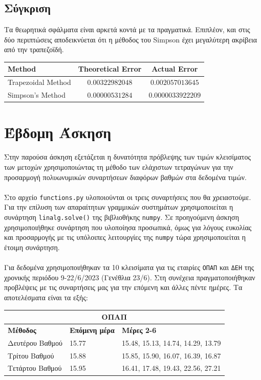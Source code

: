 \documentclass{article}
\begin{document}
\subsection{Σύγκριση}
Τα θεωρητικά σφάλματα είναι αρκετά κοντά με τα πραγματικά. Επιπλέον, και στις δύο περιπτώσεις αποδεικνύεται ότι η μέθοδος του Simpson έχει μεγαλύτερη ακρίβεια από την τραπεζοϊδή.
\begin{table}[h!]
\centering
\begin{tabular}{|l|c|c|}
\hline
\textbf{Method} & \textbf{Theoretical Error} & \textbf{Actual Error} \\
\hline
Trapezoidal Method & \( 0.00322982048 \) & \( 0.002057013645 \) \\
\hline
Simpson's Method & \( 0.00000531284 \) & \( 0.0000033922209 \) \\
\hline
\end{tabular}
\end{table}

\section{Έβδομη Άσκηση}
Στην παρούσα άσκηση εξετάζεται η δυνατότητα πρόβλεψης των τιμών κλεισίματος των μετοχών χρησιμοποιώντας τη μέθοδο των ελάχιστων τετραγώνων για την προσαρμογή πολυωνυμικών συναρτήσεων διαφόρων βαθμών στα δεδομένα τιμών.\\\\
Στο αρχείο \texttt{functions.py} υλοποιούνται οι τρεις συναρτήσεις που θα χρειαστούμε. Για την επίλυση των απαραίτητων γραμμικών συστημάτων χρησιμοποιείται η συνάρτηση \texttt{linalg.solve()} της βιβλιοθήκης \texttt{numpy}. Σε προηγούμενη άσκηση χρησιμοποιήθηκε συνάρτηση που υλοποίησα προσωπικά, όμως για λόγους ευκολίας και προσαρμογής με τις υπόλοιπες λειτουργίες της \texttt{numpy} τώρα χρησιμοποιείται η έτοιμη συνάρτηση.\\\\
Για δεδομένα χρησιμοποιήθηκαν τα 10 κλεισίματα για τις εταιρίες \texttt{ΟΠΑΠ} και \texttt{ΔΕΗ} της χρονικής περιόδου 9-22/6/2023 (Γενέθλια 23/6). Στη συνέχεια πραγματοποιήθηκαν προβλέψεις με τις συναρτήσεις μας για την επόμενη και άλλες πέντε ημέρες. Τα αποτελέσματα είναι τα εξής:
\begin{table}[ht]
\begin{tabular}{|l|l|l|}
\hline
\multicolumn{3}{|c|}{\textbf{ΟΠΑΠ}} \\
\hline
\textbf{Μέθοδος} & \textbf{Επόμενη μέρα} & \textbf{Μέρες 2-6} \\
\hline
Δευτέρου Βαθμού & 15.77 & 15.48, 15.13, 14.74, 14.29, 13.79 \\
\hline
Τρίτου Βαθμού & 15.88 & 15.85, 15.90, 16.07, 16.39, 16.87 \\
\hline
Τετάρτου Βαθμού & 15.95 & 16.41, 17.48, 19.43, 22.56, 27.21 \\
\hline
\end{tabular}
\label{table:opap_stock_closings}
\end{table}
\end{document}
